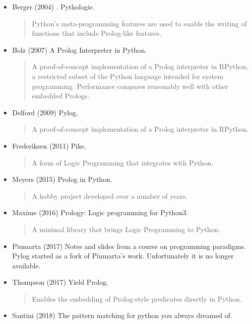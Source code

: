 \begin{itemize} 
\item Berger (2004) \cite{berger2004}. Pythologic. 
    \begin{quote}
    Python's meta-programming features are used to enable the writing of functions that include Prolog-like features.
    \end{quote}
\item Bolz (2007) \cite{Bolz2007} A Prolog Interpreter in Python.  
    \begin{quote}
    A proof-of-concept implementation of a Prolog interpreter in RPython, a restricted subset of the Python language intended for system programming. Performance compares reasonably well with other embedded Prologs.
    \end{quote}
\item Delford (2009) \cite{Delford2009} Pylog.
    \begin{quote}
    A proof-of-concept implementation of a Prolog interpreter in RPython.
    \end{quote}
\item Frederiksen (2011) \cite{Frederiksen2011} Pike.
    \begin{quote}
    A form of Logic Programming that integrates with Python.
    \end{quote}
\item Meyers (2015) \cite{Meyers2015} Prolog in Python. 
    \begin{quote}A hobby project developed over a number of years.\end{quote}
\item Maxime (2016) \cite{Maxime2016} Prology: Logic programming for Python3.
    \begin{quote}
    A minimal library that brings Logic Programming to Python.
    \end{quote}
\item Piumarta (2017) \cite{Piumarta2017} Notes and slides from a course on programming paradigms. 
 Pylog started as a fork of Piumarta's work. Unfortunately it is no longer available.
\item Thompson (2017) \cite{Thompson2017} Yield Prolog.
    \begin{quote} 
    Enables the embedding of Prolog-style predicates directly in Python. \end{quote}
\item Santini (2018) \cite{Santini2018} The pattern matching for python you always dreamed of.
    \begin{quote}

\end{quote}
\end{itemize}
